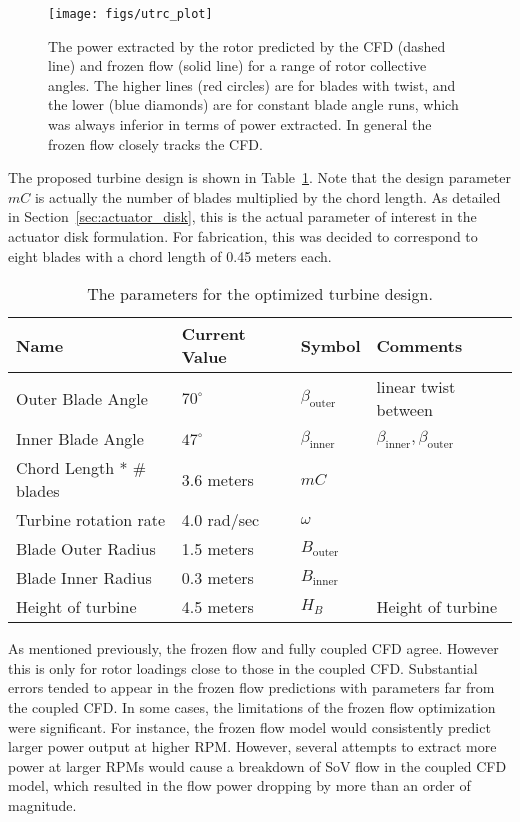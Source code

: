   \begin{figure}[!htb]
   \begin{center}
    \texttt{[image: figs/utrc\_plot]}
    \caption{The power extracted by the rotor predicted by the CFD
    (dashed line) and frozen flow (solid line) for a range of rotor
    collective angles. The higher lines (red circles) are for blades
    with twist, and the lower (blue diamonds) are for constant blade
    angle runs, which was always  inferior in terms of power
    extracted. In general the frozen flow closely tracks the CFD.}
    \label{fig:UTRC_turbine}
   \end{center}
  \end{figure}

The proposed turbine design is shown in Table~\ref{tab:turbine}. Note
that the design parameter $mC $ is actually the number of blades
multiplied by the chord length. As detailed in
Section~\ref{sec:actuator_disk}, this is the actual parameter of
interest in the actuator disk formulation. For fabrication, this was 
decided to correspond to eight blades with a chord length of 0.45 meters
each. %

\begin{table}[]
\centering
 \caption{The parameters for the optimized turbine design.}
\begin{tabular}{l|l|l|l}
Name                & Current Value    & Symbol           & Comments \\
 \hline
Outer Blade Angle & $70^{\circ}$ & $\beta_{\text{outer}}$  & linear twist between \\
Inner Blade Angle & $47^{\circ}$ & $\beta_\text{inner}$    & 
	     $\beta_\text{inner},\beta_\text{outer}$ \\ 
Chord Length * \# blades   & 3.6 meters  & $mC $ &  \\
Turbine rotation rate & 4.0 rad/sec  & $\omega$         &  \\
Blade Outer Radius  & 1.5 meters   & $B_\text{outer}$ &  \\
Blade Inner Radius  & 0.3 meters   & $B_\text{inner}$ &  \\
Height of turbine   & 4.5 meters   & $H_B$            & Height of turbine \\
\hline
\end{tabular}
 \label{tab:turbine}
\end{table}

As mentioned previously, the frozen flow and fully coupled CFD
agree. However this is only for rotor loadings close to those in the
coupled CFD. Substantial errors tended to appear in the frozen flow
predictions with parameters far from the coupled CFD. In some cases, the
limitations of the frozen flow optimization were significant. For
instance, the frozen flow model would consistently predict larger power
output at higher RPM. However, several attempts to extract more power at
larger RPMs would cause a breakdown of SoV flow in the coupled CFD
model, which resulted in the flow power dropping by more than an order
of magnitude.%

